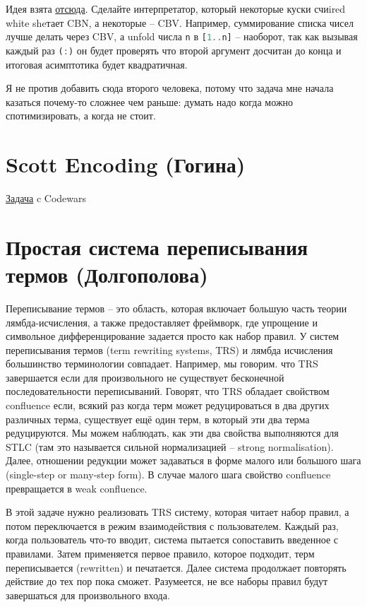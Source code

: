 \documentclass[a4paper,14pt]{article}
\def\hsinline{\lstinline[language=haskell]}
\begin{document}
Идея взята \href{http://www.haskellforall.com/2017/09/}{отсюда}.
Сделайте интерпретатор, который некоторые куски счиired white sheтает CBN, а некоторые -- CBV. Например, суммирование списка чисел лучше делать через CBV, а unfold числа \hsinline=n= в \hsinline=[1..n]= -- наоборот, так как вызывая каждый раз \hsinline=(:)= он будет проверять что второй аргумент досчитан до конца и итоговая асимптотика будет квадратичная.

% 

 Я не против добавить сюда второго человека, потому что задача мне начала казаться почему-то сложнее чем раньше: думать надо когда можно спотимизировать, а когда не стоит. 

\section{Scott Encoding (Гогина)}

\href{https://www.codewars.com/kata/scott-encoding}{Задача} c Codewars

\section{Простая система переписывания термов (Долгополова)}

Переписывание термов -- это область, которая включает большую часть теории лямбда-исчисления, а также предоставляет фреймворк, где упрощение и символьное дифференцирование задается просто как набор правил. У систем переписывания термов (term rewriting systems, TRS) и лямбда исчисления большинство терминологии совпадает. Например, мы говорим. что TRS завершается если для произвольного не существует бесконечной последовательности переписываний. Говорят, что TRS обладает свойством confluence если, всякий раз когда терм может редуцироваться в два других различных терма, существует ещё один терм, в который эти два терма редуцируются. Мы можем наблюдать, как эти два свойства выполняются для STLC (там это называется сильной нормализацией -- strong normalisation). Далее, отношении редукции может задаваться в форме малого или большого шага (single-step or many-step form). В случае малого шага свойство confluence превращается в weak confluence.

В этой задаче нужно реализовать TRS систему, которая читает набор правил, а потом переключается в режим взаимодействия с пользователем. Каждый раз, когда пользователь что-то вводит, система пытается сопоставить введенное с правилами. Затем применяется первое правило, которое подходит, терм переписывается (rewritten) и печатается. Далее система продолжает повторять действие до тех пор пока сможет. Разумеется, не все наборы правил будут завершаться для произвольного входа.
\end{document}
